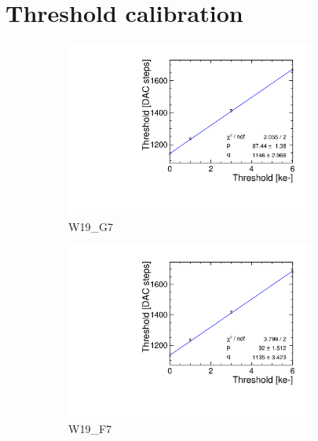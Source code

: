 \section{Threshold calibration}\label{sec:appendix_threshold_calibration}
\begin{figure}[htbp] \centering
  \begin{subfigure}[b]{0.45\textwidth}
    \includegraphics[width=0.9\textwidth]{./figures/Calibration/THLcalibration_W0019_G07.pdf}
    \caption{W19\_G7}
  \end{subfigure} \hfill
  \begin{subfigure}[b]{0.45\textwidth}
    \includegraphics[width=0.9\textwidth]{./figures/Calibration/THLcalibration_W0019_F07.pdf}
    \caption{W19\_F7}
  \end{subfigure}\\
  \begin{subfigure}[b]{0.45\textwidth}

\end{subfigure}
\end{figure}
